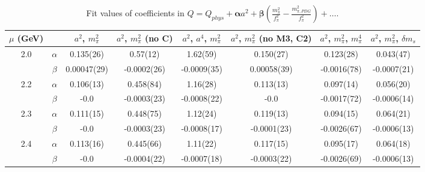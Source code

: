 \documentclass[12pt]{extarticle}
\begin{document}
\begin{table}[h!]
\begin{center}
\begin{tabular}{|c c|c|c|c|c|c|c|}
\hline
$\mu$ (GeV) &  & $a^2$, $m_\pi^2$& $a^2$, $m_\pi^2$ (no C)& $a^2$, $a^4$, $m_\pi^2$& $a^2$, $m_\pi^2$ (no M3, C2)& $a^2$, $m_\pi^2$, $m_\pi^4$& $a^2$, $m_\pi^2$, $\delta m_s$\\
\hline
\multirow{2}{0.5in}{2.0} & $\alpha$ & 0.135(26)& 0.57(12)& 1.62(59)& 0.150(27)& 0.123(28)& 0.043(47)\\
 & $\beta$ & 0.00047(29)& -0.0002(26)& -0.0009(35)& 0.00058(39)& -0.0016(78)& -0.0007(21)\\
\hline
\multirow{2}{0.5in}{2.2} & $\alpha$ & 0.106(13)& 0.458(84)& 1.16(28)& 0.113(13)& 0.097(14)& 0.056(20)\\
 & $\beta$ & -0.0& -0.0003(23)& -0.0008(22)& -0.0& -0.0017(72)& -0.0006(14)\\
\hline
\multirow{2}{0.5in}{2.3} & $\alpha$ & 0.111(15)& 0.448(75)& 1.12(24)& 0.119(13)& 0.094(15)& 0.064(21)\\
 & $\beta$ & -0.0& -0.0003(23)& -0.0008(17)& -0.0001(23)& -0.0026(67)& -0.0006(13)\\
\hline
\multirow{2}{0.5in}{2.4} & $\alpha$ & 0.113(16)& 0.445(66)& 1.11(22)& 0.117(15)& 0.095(17)& 0.064(18)\\
 & $\beta$ & -0.0& -0.0004(22)& -0.0007(18)& -0.0003(22)& -0.0026(69)& -0.0006(13)\\
\hline
\end{tabular}
\caption{Fit values of coefficients in $Q = Q_{phys} + \mathbf{\alpha} a^2 + \mathbf{\beta}\left(\frac{m_\pi^2}{f_\pi^2}-\frac{m_{\pi,PDG}^2}{f_\pi^2}\right) + \ldots$.}
\end{center}
\end{table}
























\clearpage
\end{document}
